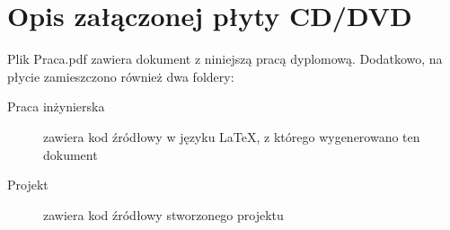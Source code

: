 \chapter{Opis załączonej płyty CD/DVD}
Plik Praca.pdf zawiera dokument z niniejszą pracą dyplomową.
Dodatkowo, na płycie zamieszczono również dwa foldery:
\begin{description}
	\item[Praca inżynierska] zawiera kod źródłowy w języku LaTeX, z którego wygenerowano ten dokument
	\item[Projekt] zawiera kod źródłowy stworzonego projektu
\end{description}